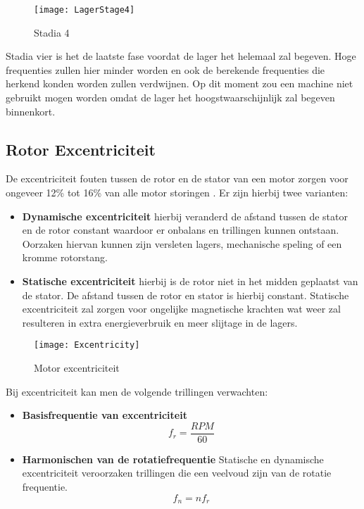 \begin{figure}[H]
	\centering
	\texttt{[image: LagerStage4]}
	\label{fig:LagerStage4}
	\caption{Stadia 4 \cite{web:BearingFault}}
\end{figure}

Stadia vier is het de laatste fase voordat de lager het helemaal zal begeven. Hoge frequenties zullen hier minder worden en ook de berekende frequenties die herkend konden worden zullen verdwijnen. Op dit moment zou een machine niet gebruikt mogen worden omdat de lager het hoogstwaarschijnlijk zal begeven binnenkort.

\newpage

\subsection{Rotor Excentriciteit}

De excentriciteit fouten tussen de rotor en de stator van een motor zorgen voor ongeveer 12\% tot 16\% van alle motor storingen \cite{MotorExcenttriciteit}. Er zijn hierbij twee varianten:

\begin{itemize}
	\item \textbf{Dynamische excentriciteit} hierbij veranderd de afstand tussen de stator en de rotor constant waardoor er onbalans en trillingen kunnen ontstaan. Oorzaken hiervan kunnen zijn versleten lagers, mechanische speling of een kromme rotorstang.
	
	\item \textbf{Statische excentriciteit} hierbij is de rotor niet in het midden geplaatst van de stator. De afstand tussen de rotor en stator is hierbij constant. Statische excentriciteit zal zorgen voor ongelijke magnetische krachten wat weer zal resulteren in extra energieverbruik en meer slijtage in de lagers.
\end{itemize}

\begin{figure}[H]
	\centering
	\texttt{[image: Excentricity]}
	\label{fig:Excentricity}
	\caption{Motor excentriciteit \cite{staticdynamicexcentricity}}
\end{figure}

Bij excentriciteit kan men de volgende trillingen verwachten:

\begin{itemize}
	\item \textbf{Basisfrequentie van excentriciteit}
		\begin{equation}
			f_r=\frac{RPM}{60}
		\end{equation}
		
	\item \textbf{Harmonischen van de rotatiefrequentie} Statische en dynamische excentriciteit veroorzaken trillingen die een veelvoud zijn van de rotatie frequentie.
		\begin{equation}
			f_n=nf_r
		\end{equation}
\end{itemize}

